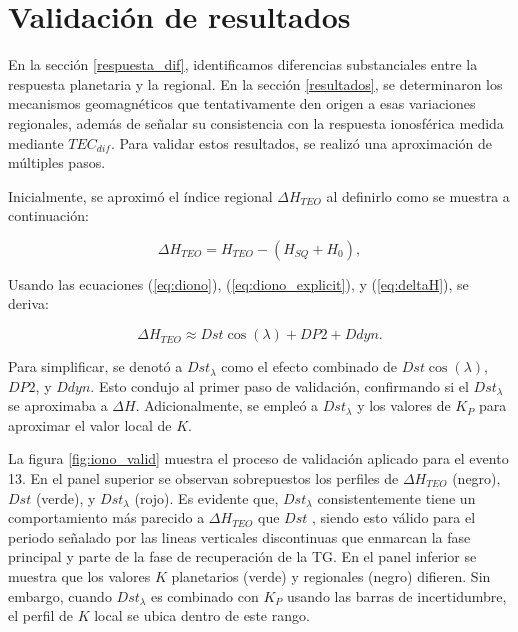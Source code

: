 \section{Validación de resultados} \label{validacion}

En la sección \ref{respuesta_dif}, identificamos diferencias substanciales entre la respuesta planetaria y la regional. En la sección \ref{resultados}, se determinaron los mecanismos geomagnéticos que tentativamente den origen a esas variaciones regionales, además de señalar su consistencia con la respuesta ionosférica medida mediante $TEC_{dif}$. Para validar estos resultados, se realizó una aproximación de múltiples pasos.  
\vspace{1 em}

Inicialmente, se aproximó el índice regional $\Delta H_{TEO}$ al definirlo como se muestra a continuación:

\begin{equation}
    \label{eq:deltaH}
    \Delta H_{TEO} = H_{TEO} - (H_{SQ} + H_0),
\end{equation}

Usando las ecuaciones (\ref{eq:diono}), (\ref{eq:diono_explicit}), y (\ref{eq:deltaH}), se deriva:

\begin{equation}
    \label{eq:deltaHandDst}
    \Delta H_{TEO} \approx Dst \cos(\lambda) + DP2 + Ddyn.
\end{equation}

Para simplificar, se denotó a $ Dst_\lambda$ como el efecto combinado de $ Dst\cos(\lambda)$, $DP2$, y $Ddyn$. Esto condujo al primer paso de validación, confirmando si el $ Dst_\lambda$ se aproximaba a $\Delta H$. Adicionalmente, se empleó a $ Dst_\lambda$ y los valores de $K_P$ para aproximar el valor local de $K$. 
\vspace{1 em}

La figura \ref{fig:iono_valid} muestra el proceso de validación aplicado para el evento 13. En el panel superior se observan sobrepuestos los perfiles de $\Delta H_{TEO}$ (negro), $Dst$ (verde), y $Dst_\lambda$ (rojo). Es evidente que, $Dst_\lambda$ consistentemente tiene un comportamiento más parecido a $\Delta H_{TEO}$ que $Dst$ , siendo esto válido para el periodo señalado por las lineas verticales discontinuas que enmarcan la fase principal y parte de la fase de recuperación de la TG. En el panel inferior se muestra que los valores $K$ planetarios (verde) y regionales (negro) difieren. Sin embargo, cuando $Dst_\lambda$ es combinado con $K_P$ usando las barras de incertidumbre, el perfil de $K$ local se ubica dentro de este rango.
\vspace{1 em}

